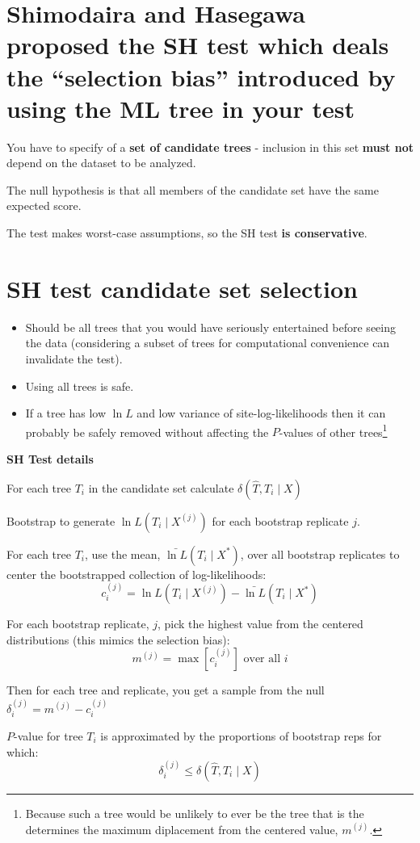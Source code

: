 \documentclass[landscape]{foils}
\begin{document}
\myNewSlide 
\section*{Shimodaira and Hasegawa proposed the SH test which deals the ``selection bias'' introduced by using the ML tree in your test}
You have to specify of a {\bf set of candidate trees} - inclusion in this set {\bf must not} depend on the dataset to be analyzed.

The null hypothesis is that all members of the candidate set have the same expected score.

The test makes worst-case assumptions, so the SH test {\bf is conservative}.

\myNewSlide
\section*{SH test candidate set selection}
\large
\begin{itemize}
	\item Should be all trees that you would have seriously entertained before seeing the data (considering a subset of trees for computational convenience can invalidate the test).
	\item Using all trees is safe.
	\item If a tree has low $\ln L$ and low variance of site-log-likelihoods then it can probably be safely removed without affecting the $P$-values of other trees\footnote{Because such a tree would be unlikely to ever be the tree that is the determines the maximum diplacement from the centered value, $m^{(j)}$.}
\end{itemize}

\myNewSlide
{\bf SH Test details}
\normalsize
\begin{compactitem}
	\item For each tree $T_i$ in the candidate set calculate $\delta(\hat{T}, T_i \mid X)$
	\item Bootstrap to generate ${\ln L}(T_i \mid X^{(j)})$ for each bootstrap replicate $j$.
	\item For each tree $T_i$, use the mean, $\bar{\ln L}(T_i \mid X^{\ast})$, over all bootstrap replicates to center the bootstrapped collection of log-likelihoods:
		$$c_i^{(j)} = {\ln L}(T_i \mid X^{(j)})-\bar{\ln L}(T_i \mid X^{\ast})$$
	\item For each bootstrap replicate, $j$, pick the highest value from the centered distributions (this mimics the selection bias): $$m^{(j)} = \max\left[c_i^{(j)}\right] \mbox{ over all } i$$
	\item Then for each tree and replicate, you get a sample from the null $\delta_i^{(j)} = m^{(j)} - c_i^{(j)}$
	\item $P$-value for tree $T_i$ is approximated by the proportions of bootstrap reps for which: $$\delta_i^{(j)} \leq \delta(\hat{T}, T_i \mid X)$$
\end{compactitem}
\end{document}
